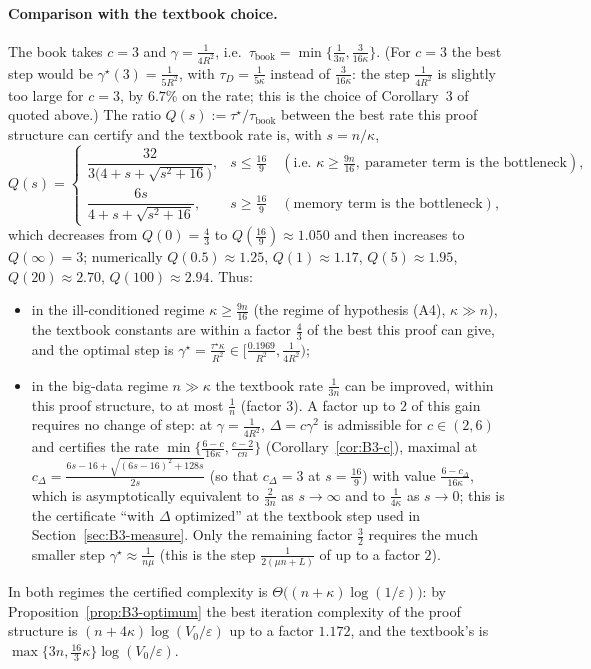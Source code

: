 \paragraph{Comparison with the textbook choice.}
The book takes $c=3$ and $\gamma=\frac1{4R^2}$, i.e.\ $\tau_{\mathrm{book}}=\min\{\frac1{3n},\frac{3}{16\kappa}\}$. (For $c=3$ the best step would be $\gamma^\star(3)=\frac1{5R^2}$, with $\tau_D=\frac{1}{5\kappa}$ instead of $\frac{3}{16\kappa}$: the step $\frac1{4R^2}$ is slightly too large for $c=3$, by $6.7\%$ on the rate; this is the choice of Corollary~3 of \cite{hofmann2015variance} quoted above.) The ratio $Q(s):=\tau^\star/\tau_{\mathrm{book}}$ between the best rate this proof structure can certify and the textbook rate is, with $s=n/\kappa$,
\[
Q(s)=\begin{cases}
\dfrac{32}{3\big(4+s+\sqrt{s^2+16}\big)}, & s\le\frac{16}{9}\quad(\text{i.e.\ }\kappa\ge\frac{9n}{16},\ \text{parameter term is the bottleneck}),\\[3mm]
\dfrac{6s}{4+s+\sqrt{s^2+16}}, & s\ge\frac{16}{9}\quad(\text{memory term is the bottleneck}),
\end{cases}
\]
which decreases from $Q(0)=\frac43$ to $Q(\frac{16}9)\approx1.050$ and then increases to $Q(\infty)=3$; numerically $Q(0.5)\approx1.25$, $Q(1)\approx1.17$, $Q(5)\approx1.95$, $Q(20)\approx2.70$, $Q(100)\approx2.94$. Thus:
\begin{itemize}[nosep]
\item in the ill-conditioned regime $\kappa\ge\frac{9n}{16}$ (the regime of hypothesis (A4), $\kappa\gg n$), the textbook constants are within a factor $\frac43$ of the best this proof can give, and the optimal step is $\gamma^\star=\frac{\tau^\star\kappa}{R^2}\in[\frac{0.1969}{R^2},\frac{1}{4R^2})$;
\item in the big-data regime $n\gg\kappa$ the textbook rate $\frac1{3n}$ can be improved, within this proof structure, to at most $\frac1n$ (factor $3$). A factor up to $2$ of this gain requires no change of step: at $\gamma=\frac1{4R^2}$, $\Delta=c\gamma^2$ is admissible for $c\in(2,6)$ and certifies the rate $\min\{\frac{6-c}{16\kappa},\frac{c-2}{cn}\}$ (Corollary~\ref{cor:B3-c}), maximal at $c_\Delta=\frac{6s-16+\sqrt{(6s-16)^2+128s}}{2s}$ (so that $c_\Delta=3$ at $s=\frac{16}9$) with value $\frac{6-c_\Delta}{16\kappa}$, which is asymptotically equivalent to $\frac2{3n}$ as $s\to\infty$ and to $\frac1{4\kappa}$ as $s\to0$; this is the certificate ``with $\Delta$ optimized'' at the textbook step used in Section~\ref{sec:B3-measure}. Only the remaining factor $\frac32$ requires the much smaller step $\gamma^\star\approx\frac1{n\mu}$ (this is the step $\frac{1}{2(\mu n+L)}$ of \cite{defazio2014saga} up to a factor $2$).
\end{itemize}
In both regimes the certified complexity is $\Theta\big((n+\kappa)\log(1/\varepsilon)\big)$: by Proposition~\ref{prop:B3-optimum} the best iteration complexity of the proof structure is $(n+4\kappa)\log(V_0/\varepsilon)$ up to a factor $1.172$, and the textbook's is $\max\{3n,\frac{16}{3}\kappa\}\log(V_0/\varepsilon)$.

